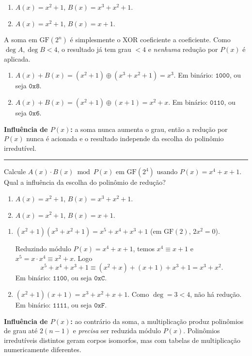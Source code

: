 \documentclass[12pt,a4paper]{article}
\newcommand{\exercicio}[1]{%
    \par\vspace{1.2em}
    \noindent
    {\color{black!55}\rule[-0.25em]{3pt}{1.6em}}%
    \hspace{0.6em}{\Large\bfseries Exerc\'{i}cio #1}
    \par\vspace{-0.4em}
    \noindent{\color{black!35}\rule{\textwidth}{0.4pt}}
    \par\vspace{0.35em}
}
\newenvironment{resposta}{%
    \begin{respostabox}
    \color{red!70!black}\sloppy
}{%
    \end{respostabox}
}
\begin{document}
\begin{enumerate}[label=\arabic*.]
    \item $A(x) = x^2 + 1$, \quad $B(x) = x^3 + x^2 + 1$.
    \item $A(x) = x^2 + 1$, \quad $B(x) = x + 1$.
\end{enumerate}

\begin{resposta}

A soma em $\mathrm{GF}(2^n)$ é simplesmente o XOR coeficiente a coeficiente. Como $\deg A, \deg B < 4$, o resultado já tem grau $< 4$ e \emph{nenhuma} redução por $P(x)$ é aplicada.

\begin{enumerate}[label=\arabic*.]
    \item $A(x) + B(x) = (x^2+1) \oplus (x^3+x^2+1) = x^3$. Em binário: $\texttt{1000}$, ou seja $\texttt{0x8}$.
    \item $A(x) + B(x) = (x^2+1) \oplus (x+1) = x^2 + x$. Em binário: $\texttt{0110}$, ou seja $\texttt{0x6}$.
\end{enumerate}

\textbf{Influência de $P(x)$:} a soma nunca aumenta o grau, então a redução por $P(x)$ nunca é acionada e o resultado independe da escolha do polinômio irredutível.

\end{resposta}

\exercicio{2}
Calcule $A(x) \cdot B(x) \bmod P(x)$ em $\mathrm{GF}(2^4)$ usando $P(x) = x^4 + x + 1$. Qual a influência da escolha do polinômio de redução?

\begin{enumerate}[label=\arabic*.]
    \item $A(x) = x^2 + 1$, \quad $B(x) = x^3 + x^2 + 1$.
    \item $A(x) = x^2 + 1$, \quad $B(x) = x + 1$.
\end{enumerate}

\begin{resposta}

\begin{enumerate}[label=\arabic*.]
    \item $(x^2+1)(x^3+x^2+1) = x^5 + x^4 + x^3 + 1$ (em $\mathrm{GF}(2)$, $2x^2 = 0$).

    Reduzindo módulo $P(x) = x^4 + x + 1$, temos $x^4 \equiv x + 1$ e $x^5 = x \cdot x^4 \equiv x^2 + x$. Logo
    \[
    x^5 + x^4 + x^3 + 1 \equiv (x^2+x) + (x+1) + x^3 + 1 = x^3 + x^2.
    \]
    Em binário: $\texttt{1100}$, ou seja $\texttt{0xC}$.

    \item $(x^2+1)(x+1) = x^3 + x^2 + x + 1$. Como $\deg = 3 < 4$, não há redução. Em binário: $\texttt{1111}$, ou seja $\texttt{0xF}$.
\end{enumerate}

\textbf{Influência de $P(x)$:} ao contrário da soma, a multiplicação produz polinômios de grau até $2(n-1)$ e \emph{precisa} ser reduzida módulo $P(x)$. Polinômios irredutíveis distintos geram corpos isomorfos, mas com tabelas de multiplicação numericamente diferentes.

\end{resposta}
\end{document}
